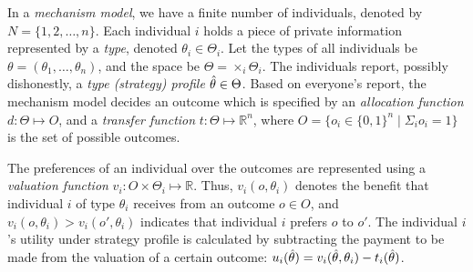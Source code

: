 In a \emph{mechanism model}, we have a finite number of individuals, denoted by $N = \{1, 2, \ldots,
n\}$.
Each individual $i$ holds a piece of private information represented by a \emph{type}, denoted
$\theta_{i} \in \Theta_i$.
Let the types of all individuals be $\theta = (\theta_1, \ldots, \theta_n)$, and the space be
$\Theta = \times_i \Theta_i$.
The individuals report, possibly dishonestly, a \emph{type (strategy) profile} $\hat{\theta} \in \Theta$.
Based on everyone's report, the mechanism model decides an outcome which is specified by an
\emph{allocation function} $d: \Theta \mapsto O$, and a \emph{transfer function} $t: \Theta \mapsto
\mathbb{R}^n$, where $O = \{o_i \in \{0,1\}^n \mid \Sigma_i o_i = 1\}$ is the set of possible
outcomes.

The preferences of an individual over the outcomes are represented using a \emph{valuation function}
$v_i: O \times \Theta_i \mapsto \mathbb{R}$.
Thus, $v_i(o, \theta_i)$ denotes the benefit that individual $i$ of type $\theta_i$ receives from an
outcome $o \in O$, and $v_i(o,\theta_i) > v_i(o',\theta_i)$ indicates that individual $i$ prefers
$o$ to $o'$.
The individual $i$'s utility under strategy profile \report is calculated by subtracting the
payment to be made from the valuation of a certain outcome: $u_i(\hat{\theta}) = v_i(\hat{\theta},
\theta_i) - t_i(\hat{\theta})$.